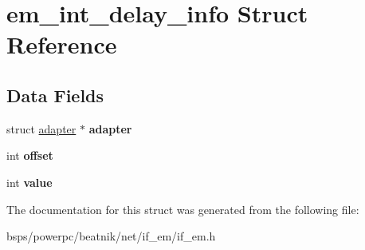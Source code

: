 \hypertarget{structem__int__delay__info}{}\section{em\+\_\+int\+\_\+delay\+\_\+info Struct Reference}
\label{structem__int__delay__info}
\subsection*{Data Fields}
\begin{DoxyCompactItemize}
\item 
\mbox{\label{structem__int__delay__info_ace5ae138f228f8616b9c25176dc50fbe}} 
struct \mbox{\hyperlink{structadapter}{adapter}} $\ast$ {\bfseries adapter}
\item 
\mbox{\label{structem__int__delay__info_aa23755c3013793a9b00ed9583e164a4f}} 
int {\bfseries offset}
\item 
\mbox{\label{structem__int__delay__info_a7354ae1338cc41cc13a111c52397e6b7}} 
int {\bfseries value}
\end{DoxyCompactItemize}


The documentation for this struct was generated from the following file\+:\begin{DoxyCompactItemize}
\item 
bsps/powerpc/beatnik/net/if\+\_\+em/if\+\_\+em.\+h\end{DoxyCompactItemize}
